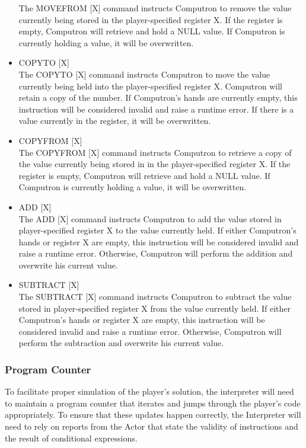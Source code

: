 \begin{itemize}
	The MOVEFROM [X] command instructs Computron to remove the value currently being 
	stored in the player-specified register X. If the register is empty, Computron will retrieve 
	and hold a NULL value. If Computron is currently holding a value, it will be overwritten.
	\item COPYTO [X]\\
	The COPYTO [X] command instructs Computron to move the value currently being held 
	into the player-specified register X. Computron will retain a copy of the number. If 
	Computron's hands are currently empty, this instruction will be considered invalid and raise a 
	runtime error. If there is a value currently in the register, it will be overwritten.
	\item COPYFROM [X]\\
	The COPYFROM [X] command instructs Computron to retrieve a copy of the value currently 
	being stored in in the player-specified register X. If the register is empty, Computron will 
	retrieve and hold a NULL value. If Computron is currently holding a value, it will be overwritten.
	\item ADD [X]\\
	The ADD [X] command instructs Computron to add the value stored in player-specified 
	register X to the value currently held. If either Computron's hands or register X are empty, this 
	instruction will be considered invalid and raise a runtime error. Otherwise, Computron will 
	perform the addition and overwrite his current value.\\
\newpage
	\item SUBTRACT [X]\\
	The SUBTRACT [X] command instructs Computron to subtract the value stored in 
	player-specified register X from the value currently held. If either Computron's hands or 
	register X are empty, this instruction will be considered invalid and raise a runtime error. 
	Otherwise, Computron will perform the subtraction and overwrite his current value.
\end{itemize}

\subsubsection{Program Counter}
To facilitate proper simulation of the player's solution, the interpreter will need to maintain 
a program counter that iterates and jumps through the player's code appropriately. To 
ensure that these updates happen correctly, the Interpreter will need to rely on reports 
from the Actor that state the validity of instructions and the result of conditional expressions.

